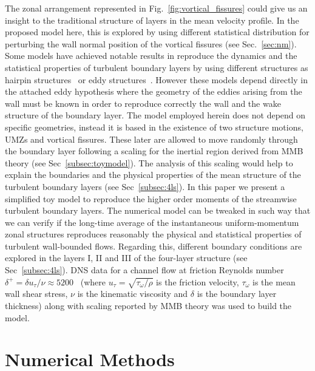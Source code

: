 \documentclass[aps,reprint,amsmath,amssymb,pra]{revtex4-1}%
\begin{document}
The zonal arrangement represented in Fig.~\ref{fig:vortical_fissures} could give us an insight to the traditional structure of layers in the mean velocity profile. In the proposed model here, this is explored by using different statistical distribution for perturbing the wall normal position of the vortical fissures (see Sec.~\ref{sec:nm}). 
Some models have achieved  notable results in reproduce the dynamics and the statistical properties of turbulent boundary layers by using different structures as hairpin structures~\citep{adrian2007} or eddy structures~\citep{perry1995}. However these models depend directly in the attached eddy hypothesis where the geometry of the eddies arising from the wall must be known in order to reproduce correctly the wall and the wake structure of the boundary layer. The model employed herein does not depend on specific geometries, instead it is based in the existence of two structure motions, UMZs and vortical fissures. These later are allowed to move randomly through the boundary layer following a scaling for the inertial region derived from MMB theory (see Sec~\ref{subsec:toymodel}). The   analysis of this scaling would help to explain the boundaries and the physical properties of the mean structure of the turbulent boundary layers (see Sec~\ref{subsec:4ls}). 
In this paper we present a simplified toy model to reproduce the higher order moments of the streamwise turbulent boundary layers. The numerical model can be tweaked in such way that we can verify if the long-time average of the instantaneous uniform-momentum zonal structures reproduces reasonably the physical and statistical properties of turbulent wall-bounded flows. Regarding this, different boundary conditions are explored in the layers I, II and III of the four-layer structure (see Sec~\ref{subsec:4ls}). DNS data for a channel flow at friction Reynolds number $\delta^+=\delta u_{\tau}/\nu\approx 5200$~\cite{leemoser2015} (where $u_{\tau}=\sqrt{\tau_{\omega}/\rho}$ is the friction velocity, $\tau_{\omega}$ is the mean wall shear stress, $\nu$ is the kinematic viscosity and $\delta$ is the boundary layer thickness) along with scaling reported by MMB theory was used to build the model. 

\section{\label{sec:nm} Numerical Methods}
\end{document}
